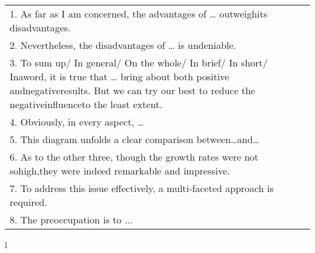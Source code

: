 \begin{tabular}{l}
    1. As far as I am concerned, the advantages of … outweighits disadvantages.                                                                                                                                      \\
    2. Nevertheless, the disadvantages of … is undeniable.                                                                                                                                                           \\
    3. To sum up/ In general/ On the whole/ In brief/ In short/ Inaword, it is true that … bring about both positive andnegativeresults. But we can try our best to reduce the negativeinfluenceto the least extent. \\
    4. Obviously, in every aspect, …                                                                                                                                                                                 \\
    5. This diagram unfolds a clear comparison between…and…                                                                                                                                                          \\
    6. As to the other three, though the growth rates were not sohigh,they were indeed remarkable and impressive.                                                                                                    \\
    7. To address this issue effectively, a multi-faceted approach is required.                                                                                                                                      \\
    8. The preoccupation is to ...                                                                                                                                                                                   \\
\end{tabular}{l}
